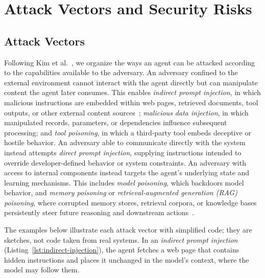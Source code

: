 
\section{Attack Vectors and Security Risks}

\subsection{Attack Vectors}

Following Kim et al.~\cite{kim2026sok}, we organize the ways an agent can be attacked according to the capabilities available to the adversary. An adversary confined to the external environment cannot interact with the agent directly but can manipulate content the agent later consumes. This enables \emph{indirect prompt injection}, in which malicious instructions are embedded within web pages, retrieved documents, tool outputs, or other external content sources~\cite{greshake}; \emph{malicious data injection}, in which manipulated records, parameters, or dependencies influence subsequent processing; and \emph{tool poisoning}, in which a third-party tool embeds deceptive or hostile behavior.
An adversary able to communicate directly with the system instead attempts \emph{direct prompt injection}, supplying instructions intended to override developer-defined behavior or system constraints. An adversary with access to internal components instead targets the agent's underlying state and learning mechanisms. This includes \emph{model poisoning}, which backdoors model behavior, and \emph{memory poisoning} or \emph{retrieval-augmented generation (RAG) poisoning}, where corrupted memory stores, retrieval corpora, or knowledge bases persistently steer future reasoning and downstream actions~\cite{agentpoison,poisonedrag}.



The examples below illustrate each attack vector with simplified code; they are sketches, not code taken from real systems. In an \emph{indirect prompt injection} (Listing~\ref{lst:indirect-injection}), the agent fetches a web page that contains hidden instructions and places it unchanged in the model's context, where the model may follow them.

